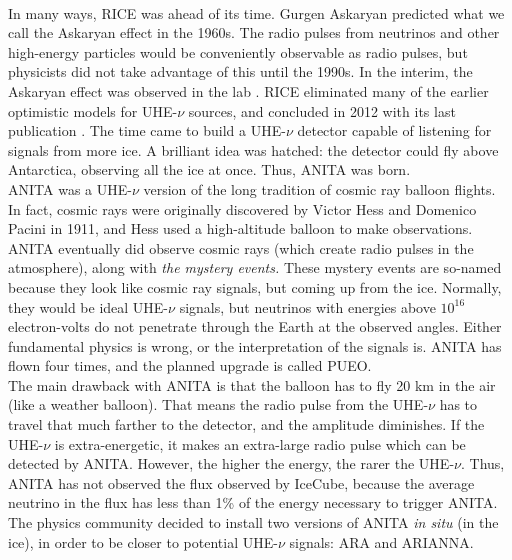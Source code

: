 \documentclass[../../../main.tex]{subfiles}
\begin{document}
\\
\vspace{0.25cm}
In many ways, RICE was ahead of its time.  Gurgen Askaryan predicted what we call the Askaryan effect in the 1960s.  The radio pulses from neutrinos and other high-energy particles would be conveniently observable as radio pulses, but physicists did not take advantage of this until the 1990s.  In the interim, the Askaryan effect was observed in the lab \cite{PhysRevLett.86.2802} \cite{PhysRevLett.99.171101}. RICE eliminated many of the earlier optimistic models for UHE-$\nu$ sources, and concluded in 2012 with its last publication \cite{PhysRevD.85.062004}.  The time came to build a UHE-$\nu$ detector capable of listening for signals from more ice.  A brilliant idea was hatched: the detector could fly above Antarctica, observing all the ice at once.  Thus, ANITA was born.
\\
\vspace{0.25cm}
ANITA was a UHE-$\nu$ version of the long tradition of cosmic ray balloon flights.  In fact, cosmic rays were originally discovered by Victor Hess and Domenico Pacini in 1911, and Hess used a high-altitude balloon to make observations.  ANITA eventually did observe cosmic rays (which create radio pulses in the atmosphere), along with \textit{the mystery events.}  These mystery events are so-named because they look like cosmic ray signals, but coming up from the ice.  Normally, they would be ideal UHE-$\nu$ signals, but neutrinos with energies above $10^{16}$ electron-volts do not penetrate through the Earth at the observed angles.  Either fundamental physics is wrong, or the interpretation of the signals is.  ANITA has flown four times, and the planned upgrade is called PUEO.
\\
\vspace{0.25cm}
The main drawback with ANITA is that the balloon has to fly 20 km in the air (like a weather balloon).  That means the radio pulse from the UHE-$\nu$ has to travel that much farther to the detector, and the amplitude diminishes.  If the UHE-$\nu$ is extra-energetic, it makes an extra-large radio pulse which can be detected by ANITA.  However, the higher the energy, the rarer the UHE-$\nu$.  Thus, ANITA has not observed the flux observed by IceCube, because the average neutrino in the flux has less than 1\% of the energy necessary to trigger ANITA.  The physics community decided to install two versions of ANITA \textit{in situ} (in the ice), in order to be closer to potential UHE-$\nu$ signals: ARA and ARIANNA.
\\
\end{document}
